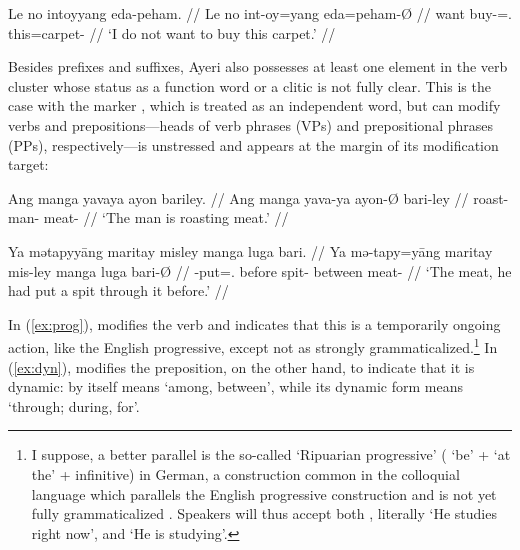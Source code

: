 \ex\begingl
	\gla Le no intoyyang eda-peham. //
	\glb Le no int-oy=yang eda=peham-Ø //
	\glc \PatTI{} want buy-\Neg{}=\Fsg{}.\Aarg{} this=carpet-\Top{} //
	\glft `I do not want to buy this carpet.' //
\endgl\xe

Besides prefixes and suffixes, Ayeri also possesses at least one element in the
verb cluster whose status as a function word or a clitic is not fully clear.
This is the case with the marker , which is treated as an
independent word, but can modify verbs and prepositions---heads of verb phrases
(VPs) and prepositional phrases (PPs), respectively---is unstressed and appears
at the margin of its modification target:

\pex
\a\label{ex:prog}\begingl
	\gla Ang manga yavaya ayon bariley. //
	\glb Ang manga yava-ya ayon-Ø bari-ley //
	\glc \AgtT{} \Prog{} roast-\TsgM{} man-\Top{} meat-\PargI{} //
	\glft `The man is roasting meat.' //
\endgl

\a\label{ex:dyn}\begingl
	\gla Ya mətapyyāng maritay misley manga luga bari. //
	\glb Ya mə-tapy=yāng maritay mis-ley manga luga bari-Ø //
	\glc \LocT{} \Pst{}-put=\TsgM{}.\Aarg{} before spit-\PargI{} \Dyn{} 
		between meat-\Top{} //
	\glft `The meat, he had put a spit through it before.' //
\endgl

\xe

In (\ref{ex:prog}),  modifies the verb 
and indicates that this is a temporarily ongoing action, like the English
progressive, except not as strongly grammaticalized.\footnote{I suppose, a
better parallel is the so-called  `Ripuarian
progressive' ( `be' +  `at the' + infinitive) in German, a
construction common in the colloquial language which parallels the English
progressive construction and is not yet fully grammaticalized
\citep[435]{dudengram2016}. Speakers will thus accept both , literally `He studies right now', and  `He is
studying'.
% 
}
%
In (\ref{ex:dyn}),  modifies the preposition, on the other 
hand, to indicate that it is dynamic:  by itself means `among, 
between', while its dynamic form  means `through; 
during, for'.

